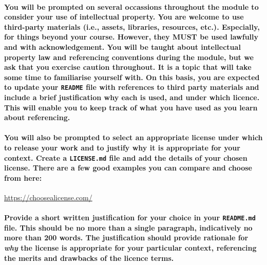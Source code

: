 \documentclass{../../fal_assignment}
\begin{document}


\paragraph{You will be prompted on several occassions throughout the module to consider your use of intellectual property. You are welcome to use third-party materials (i.e., assets, libraries, resources, etc.). Especially, for things beyond your course. However, they \textbf{MUST} be used lawfully and with acknowledgement. You will be taught about intellectual property law and referencing conventions during the module, but we ask that you exercise caution throughout. It is a topic that will take some time to familiarise yourself with. On this basis, you are expected to update your \texttt{README} file with references to third party materials and include a brief justification why each is used, and under which licence. This will enable you to keep track of what you have used as you learn about referencing.}

\paragraph{You will also be prompted to select an appropriate license under which to release your work and to justify why it is appropriate for your context. Create a \texttt{LICENSE.md} file and add the details of your chosen license. There are a few good examples you can compare and choose from here:}

\url{https://choosealicense.com/}

\paragraph{Provide a short written justification for your choice in your \texttt{README.md} file. This should be no more than a single paragraph, indicatively no more than 200 words. The justification should provide rationale for \textit{why} the license is appropriate for your particular context, referencing the merits and drawbacks of the licence terms.}
\end{document}
